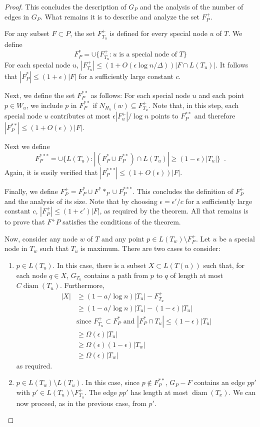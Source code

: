 \documentclass{patmorin}
\DeclareMathOperator{\diam}{diam}
\begin{document}
\begin{proof}
  This concludes the description of $G_P$
  and the analysis of the number of edges in $G_P$. What remains it is
  to describe and analyze the set $F^+_P$.

  For any subset $F\subset P$, the set $F^+_{T_u}$ is defined for every
  special node $u$ of $T$.  We define
  \[  F^*_P = \cup\{F^+_{T_u}: \text{$u$ is a special node of $T$}\}
  \]
  For each special node $u$, $|F^+_{T_u}| \le (1+O(\epsilon\log
  n/\Delta))|F\cap L(T_u)|$.  It follows that $|F^*_P| \le (1+\epsilon)|F|$
  for a sufficiently large constant $c$.

  Next, we define the set $F^{**}_P$ as follows: For each special node $u$
  and each point $p\in W_u$, we include $p$ in $F^{**}_P$ if $N_{H_u}(w)
  \subseteq F^+_{T_u}$.  Note that, in this step, each special node $u$
  contributes at most $\epsilon |F^+_u|/\log n$ points to $F^{**}_P$
  and therefore $|F^{**}_P| \le (1+O(\epsilon))|F|$.

  Next we define 
  \[  F^{***}_P = \cup\{L(T_u) : |(F^*_P\cup F^{**}_P)\cap L(T_u)| \ge (1-\epsilon)|T_u|\} \enspace . \]
  Again, it is easily verified that $|F^{***}_P| \le (1+O(\epsilon))|F|$.

  Finally, we define $F^+_P= F^*_P\cup F^**_P\cup F^{***}_P$.   This
  concludes the definition of $F^+_P$ and the analysis of its size.
  Note that by choosing $\epsilon = \epsilon' /c$ for a sufficiently large
  constant $c$, $|F^+_P|\le (1+\epsilon')|F|$, as required by the theorem.
  All that remains is to prove that $F^+P$ satisfies the conditions of
  the theorem.  

  Now, consider any node $w$ of $T$ and any point $p\in L(T_w)\setminus F^+_P$.
  Let $u$ be a special node in $T_w$ such that $T_u$ is maximum.
  There are two cases to consider:
  \begin{enumerate}
    \item $p\in L(T_u)$. In this case, there is a subset $X\subset L(T(u))$
     such that, for each node $q\in X$, $G_{T_u}$ contains a path from
     $p$ to $q$ of length at most $C\diam(T_u)$. Furthermore,
    \begin{align*}
	    |X| & \ge (1-a/\log n)|T_u| - F^+_{T_u} \\
	        & \ge (1-a/\log n)|T_u| - (1-\epsilon)|T_u| \\
	       & \text{since $F^+_{T_u} \subset F^*_P$ and $|F^*_P\cap T_u|\le (1-\epsilon)|T_u|$} \\
		& \ge \Omega(\epsilon)|T_u| \\ 
		& \ge \Omega(\epsilon)(1-\epsilon)|T_w|  \\
		& \ge \Omega(\epsilon)|T_w| 
    \end{align*}
    as required.
    \item $p\in L(T_w)\setminus L(T_u)$.  In this case, since $p\not\in
    F^{**}_P$, $G_P-F$ contains an edge $pp'$ with $p'\in L(T_u)\setminus
    F^{+}_{T_u}$.  The edge $pp'$ has length at most $\diam(T_x)$.
    We can now proceed, as in the previous case, from $p'$.
  \end{enumerate}
\end{proof}
\end{document}
